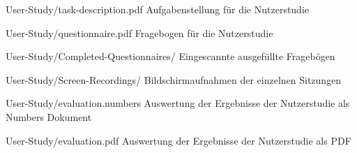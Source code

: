 \begin{fileslist}

\item[User-Study/task-description.pdf] 
Aufgabenstellung für die Nutzerstudie

\item[User-Study/questionnaire.pdf]
Fragebogen für die Nutzerstudie

\item[User-Study/Completed-Questionnaires/]
Eingescannte ausgefüllte Fragebögen

\item[User-Study/Screen-Recordings/]
Bildschirmaufnahmen der einzelnen Sitzungen

\item[User-Study/evaluation.numbers]
Auswertung der Ergebnisse der Nutzerstudie als Numbers Dokument

\item[User-Study/evaluation.pdf]
Auswertung der Ergebnisse der Nutzerstudie als PDF

\end{fileslist}
